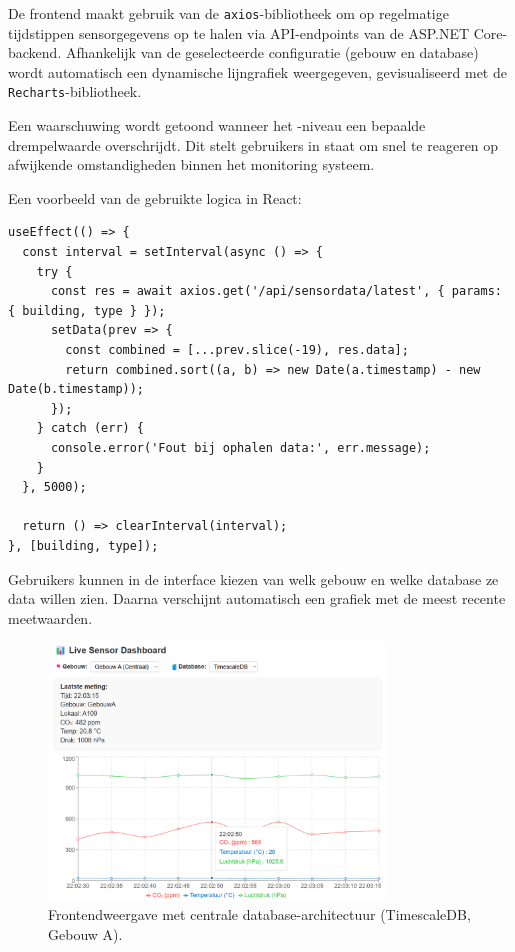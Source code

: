 De frontend maakt gebruik van de \texttt{axios}-bibliotheek om op regelmatige tijdstippen sensorgegevens op te halen via API-endpoints van de ASP.NET Core-backend.
 Afhankelijk van de geselecteerde configuratie (gebouw en database) wordt automatisch een dynamische lijngrafiek weergegeven, gevisualiseerd met de \texttt{Recharts}-bibliotheek.

Een waarschuwing wordt getoond wanneer het -niveau een bepaalde drempelwaarde overschrijdt. Dit stelt gebruikers in staat om snel te reageren op afwijkende omstandigheden binnen het monitoring systeem.

Een voorbeeld van de gebruikte logica in React:

\begin{verbatim}
useEffect(() => {
  const interval = setInterval(async () => {
    try {
      const res = await axios.get('/api/sensordata/latest', { params: { building, type } });
      setData(prev => {
        const combined = [...prev.slice(-19), res.data];
        return combined.sort((a, b) => new Date(a.timestamp) - new Date(b.timestamp));
      });
    } catch (err) {
      console.error('Fout bij ophalen data:', err.message);
    }
  }, 5000);

  return () => clearInterval(interval);
}, [building, type]);
\end{verbatim}

Gebruikers kunnen in de interface kiezen van welk gebouw en welke database ze data willen zien. 
 Daarna verschijnt automatisch een grafiek met de meest recente meetwaarden.

\begin{figure}[H]
	\centering
	\includegraphics[width=0.8\textwidth]{GebouwA_TimeScale_Website.png}
	\caption{Frontendweergave met centrale database-architectuur (TimescaleDB, Gebouw A).}
    \label{fig:gebouw-a-architecture}
\end{figure}

